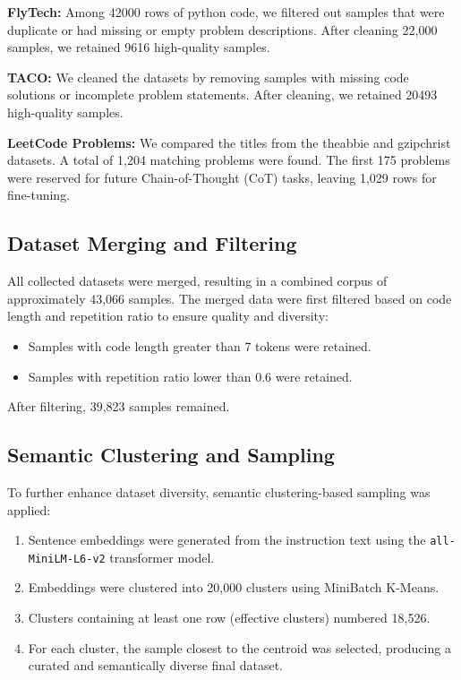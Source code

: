\textbf{FlyTech:} Among 42000 rows of python code, we filtered out samples that were duplicate or had missing or empty problem descriptions. After cleaning 22,000 samples, we retained 9616 high-quality samples.

\textbf{TACO:} We cleaned the datasets by removing samples with missing code solutions or incomplete problem statements. After cleaning, we retained 20493 high-quality samples.

\textbf{LeetCode Problems:} We compared the titles from the theabbie and gzipchrist datasets. A total of 1,204 matching problems were found. The first 175 problems were reserved for future Chain-of-Thought (CoT) tasks, leaving 1,029 rows for fine-tuning.

\subsection{Dataset Merging and Filtering}
All collected datasets were merged, resulting in a combined corpus of approximately 43,066 samples. The merged data were first filtered based on code length and repetition ratio to ensure quality and diversity:
\begin{itemize}
    \item Samples with code length greater than 7 tokens were retained.
    \item Samples with repetition ratio lower than 0.6 were retained.
\end{itemize}

After filtering, 39,823 samples remained. 

\subsection{Semantic Clustering and Sampling}
To further enhance dataset diversity, semantic clustering-based sampling was applied:
\begin{enumerate}
    \item Sentence embeddings were generated from the instruction text using the \texttt{all-MiniLM-L6-v2} transformer model.
    \item Embeddings were clustered into 20,000 clusters using MiniBatch K-Means.
    \item Clusters containing at least one row (effective clusters) numbered 18,526.
    \item For each cluster, the sample closest to the centroid was selected, producing a curated and semantically diverse final dataset.
\end{enumerate}

